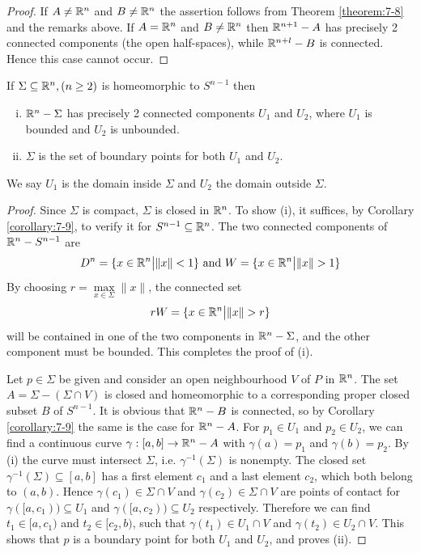 \begin{proof}
  If $A\neq \mathbb{R}^n$ and $B\neq \mathbb{R}^n$ the assertion follows from Theorem \ref{theorem:7-8} and 
  the remarks above. If $A= \mathbb{R}^n$ and $B\neq \mathbb{R}^n$ then $\mathbb{R}^{n+1}-A$ has precisely 2 connected
  components (the open half-spaces), while $\mathbb{R}^{n+l} - B$ is connected. Hence this case 
  cannot occur.
\end{proof}


\begin{theorem}\label{theorem:7-10}
  If $\Sigma\subseteq\mathbb{R}^n, (n\ge 2)$ is homeomorphic to $S^{n-1}$ then 
  \begin{enumerate}[(i)]
    \item $\mathbb{R}^n-\Sigma$ has precisely 2 connected components $U_1$ and $U_2$, where 
      $U_1$ is bounded and $U_2$ is unbounded.
    \item $\Sigma$ is the set of boundary points for both $U_1$ and $U_2$.
  \end{enumerate}
  We say $U_1$ is the domain inside $\Sigma$ and $U_2$ the domain outside $\Sigma$.
\end{theorem}

\begin{proof}
  Since $\Sigma$ is compact, $\Sigma$ is closed in $\mathbb{R}^n$. To show (i), it suffices, by Corollary
  \ref{corollary:7-9}, to verify it for $S^{n-1}\subseteq\mathbb{R}^n$. The two connected components of $\mathbb{R}^n-S^{n-1}$
  are 
  \begin{align*}
    D^n = \{x\in \RR^n\big|\|x\|<1 \} \text{ and } W = \{x\in\RR^n\big| \|x\|>1\}
  \end{align*}
  By choosing $r=\max\limits_{x\in\Sigma}\|x\|$, the connected set 
  \begin{align*}
    rW = \{x\in\RR^n \big| \|x\|>r\}
  \end{align*}
  will be contained in one of the two components in $\mathbb{R}^n-\Sigma$, and the other component
must be bounded. This completes the proof of (i).

  Let $p\in\Sigma$ be given and consider an open neighbourhood $V$ of $P$ in $\mathbb{R}^n$. The set
  $A=\Sigma-(\Sigma\cap V)$ is closed and homeomorphic to a corresponding proper closed
  subset $B$ of $S^{n-1}$. It is obvious that $\mathbb{R}^n-B$ is connected, so by Corollary \ref{corollary:7-9}
  the same is the case for $\mathbb{R}^n-A$. For $p_1\in U_1$ and $p_2\in U_2$, we can find a continuous curve 
  $\gamma:[a, b]\to\mathbb{R}^n-A$ with $\gamma(a)=p_1$ and $\gamma(b)=p_2$. By (i) the curve must intersect 
  $\Sigma$, i.e. $\gamma^{-1}(\Sigma)$ is nonempty. The closed set $\gamma^{-1}(\Sigma)\subseteq[a, b]$ has 
  a first element $c_1$ and a last element $c_2$, which both belong to $(a, b)$. Hence $\gamma(c_1)\in\Sigma\cap V$
  and $\gamma(c_2)\in\Sigma\cap V$ are points of contact for $\gamma([a, c_1))\subseteq U_1$ and 
  $\gamma([a, c_2))\subseteq U_2$ respectively. Therefore we can find $t_1\in [a, c_1)$ and $t_2\in[c_2, b)$,
  such that $\gamma(t_1)\in U_1\cap V$ and $\gamma(t_2)\in U_2\cap V$. This shows that $p$ is a boundary
  point for both $U_1$ and $U_2$, and proves (ii).
\end{proof}

